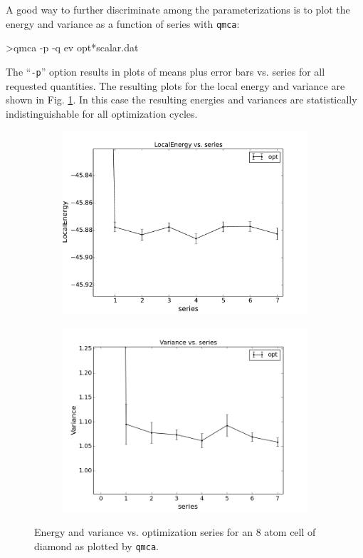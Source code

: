 A good way to further discriminate among the parameterizations is to 
plot the energy and variance as a function of series with \texttt{qmca}:
\begin{shade}
>qmca -p -q ev opt*scalar.dat
\end{shade}
\noindent
The ``\texttt{-p}'' option results in plots of means plus error bars 
vs. series for all requested quantities.
The resulting plots for the local energy and variance are shown 
in Fig. \ref{fig:qmca_opt_ev}.  In this case the resulting energies 
and variances are statistically indistinguishable for all optimization 
cycles.  

\begin{figure}
  \centering
  \begin{subfigure}[t]{0.47\textwidth}
    \centering
    \includegraphics[trim=0mm 0mm 4mm 0mm,clip,width=\linewidth]{figures/qmca_opt_energy.pdf}
  \end{subfigure}
  \begin{subfigure}[t]{0.47\textwidth}
    \centering
    \includegraphics[trim=2mm 0mm 4mm 0mm,clip,width=\linewidth]{figures/qmca_opt_variance.pdf}
  \end{subfigure}
  \caption{Energy and variance vs. optimization series for an 8 atom cell of diamond as plotted by \texttt{qmca}.\label{fig:qmca_opt_ev}}
\end{figure}

